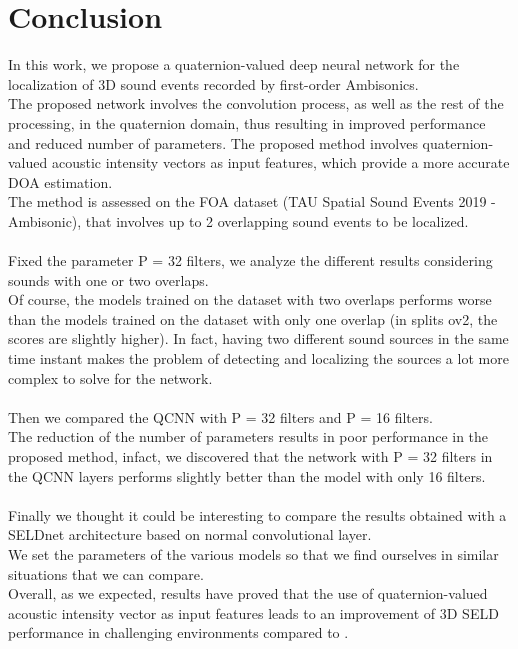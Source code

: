 \documentclass{article}
\begin{document}
    \section{Conclusion}
    In this work, we propose a quaternion-valued deep neural network for the localization of 3D sound events recorded by first-order Ambisonics.\\
    The proposed network involves the convolution process, as well as the rest of the processing, in the quaternion domain, thus resulting in improved performance and reduced number of parameters. The proposed method involves quaternion-valued acoustic intensity vectors as input features, which provide a more accurate DOA estimation.\\
    The method is assessed on the FOA dataset (TAU Spatial Sound Events 2019 - Ambisonic), that involves up to 2 overlapping sound events to be localized.\\
    \\
    Fixed the parameter P = 32 filters, we analyze the different results considering sounds with one or two overlaps.\\
    Of course, the models trained on the dataset with two overlaps performs worse than the models trained on the dataset with only one overlap (in splits ov2, the scores are slightly higher). In fact, having two different sound sources in the same time instant makes the problem of detecting and localizing the sources a lot more complex to solve for the network.\\
    \\
    Then we compared the QCNN with P = 32 filters and P = 16 filters.\\
    The reduction of the number of parameters results in poor performance in the proposed method, infact, we discovered that the network with P = 32 filters in the QCNN layers performs slightly better than the model with only 16 filters.\\
    \\ 
    Finally we thought it could be interesting to compare the results obtained with a SELDnet architecture based on normal convolutional layer.\\
    We set the parameters of the various models so that we find ourselves in similar situations that we can compare.\\
    Overall, as we expected, results have proved that the use of quaternion-valued acoustic intensity vector as input features leads to an improvement of 3D SELD performance in challenging environments compared to .\\
\end{document}
